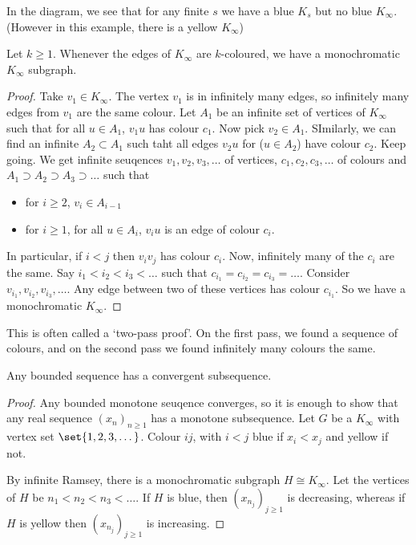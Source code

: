 \documentclass{article}
\begin{document}
In the diagram, we see that for any finite $s$ we have a blue $K_s$ but no blue $K_\infty$.  (However in this example, there is a yellow $K_\infty$)

\begin{nthm}\label{thm:infRamsey}
    Let $k \geq 1$. Whenever the edges of $K_\infty$ are $k$-coloured, we have a monochromatic $K_\infty$ subgraph.
\end{nthm}

\begin{proof}
    Take $v_1 \in K_\infty$.  The vertex $v_1$ is in infinitely many edges, so infinitely many edges from $v_1$ are the same colour.
    Let $A_1$ be an infinite set of vertices of $K_\infty$ such that for all $u \in A_1$, $v_1 u$ has colour $c_1$.
    Now pick $v_2 \in A_1$. SImilarly, we can find an infinite $A_2 \subset A_1$ such taht all edges $v_2 u$ for ($u \in A_2$) have colour $c_2$.
    Keep going. We get infinite seuqences $v_1, v_2, v_3, \dotsc$ of vertices, $c_1, c_2, c_3, \dotsc$ of colours and $A_1 \supset A_2 \supset A_3 \supset \dots$ such that
    \begin{itemize}
        \item for $i \geq 2$, $v_i \in A_{i-1}$
        \item for $i \geq 1$, for all $u \in A_i$, $v_i u$ is an edge of colour $c_i$.
    \end{itemize}
    In particular, if $i < j$ then $v_i v_j$ has colour $c_i$. Now, infinitely many of the $c_i$ are the same.
    Say $i_1 < i_2 < i_3 < \dots$ such that $c_{i_1} = c_{i_2} = c_{i_3} = \dotsc$.
    Consider $v_{i_1}, v_{i_2}, v_{i_3}, \dotsc$. Any edge between two of these vertices has colour $c_{i_1}$. So we have a monochromatic $K_\infty$.
\end{proof}

\begin{remark}
    This is often called a `two-pass proof'. On the first pass, we found a sequence of colours, and on the second pass we found infinitely many colours the same.
\end{remark}

\begin{ncor}
    Any bounded sequence has a convergent subsequence.
\end{ncor}

\begin{proof}
    Any bounded monotone seuqence converges, so it is enough to show that any real sequence $(x_n)_{n \geq 1}$ has a monotone subsequence.
    Let $G$ be a $K_\infty$ with vertex set $\set{1, 2, 3, \dotsc}$. Colour $ij$, with $i<j$ blue if $x_i < x_j$ and yellow if not.

    By infinite Ramsey, there is a monochromatic subgraph $H \cong K_\infty$. Let the vertices of $H$ be $n_1 < n_2 < n_3 < \dots$.
    If $H$ is blue, then $(x_{n_j})_{j \geq 1}$ is decreasing, whereas if $H$ is yellow then $(x_{n_j})_{j \geq 1}$ is increasing.
\end{proof}
\end{document}
